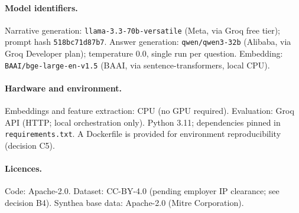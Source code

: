\paragraph{Model identifiers.}
Narrative generation: \texttt{llama-3.3-70b-versatile} (Meta, via Groq free tier);
prompt hash \texttt{518bc71d87b7}.
Answer generation: \texttt{qwen/qwen3-32b} (Alibaba, via Groq Developer plan);
temperature 0.0, single run per question.
Embedding: \texttt{BAAI/bge-large-en-v1.5} (BAAI, via sentence-transformers, local CPU).

\paragraph{Hardware and environment.}
Embeddings and feature extraction: CPU (no GPU required).
Evaluation: Groq API (HTTP; local orchestration only).
Python 3.11; dependencies pinned in \texttt{requirements.txt}.
A Dockerfile is provided for environment reproducibility (decision C5).

\paragraph{Licences.}
Code: Apache-2.0.
Dataset: CC-BY-4.0 (pending employer IP clearance; see decision B4).
Synthea base data: Apache-2.0 (Mitre Corporation).
